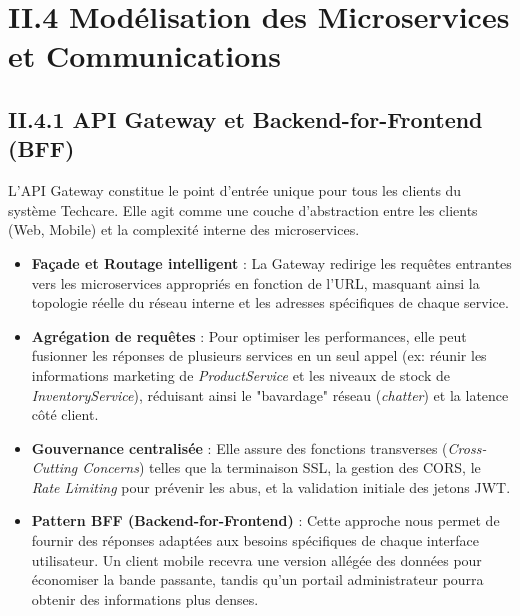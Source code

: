 \section{II.4 Modélisation des Microservices et Communications}
\label{sec:patterns}

\subsection{II.4.1 API Gateway et Backend-for-Frontend (BFF)}
L'API Gateway constitue le point d'entrée unique pour tous les clients du système Techcare. Elle agit comme une couche d'abstraction entre les clients (Web, Mobile) et la complexité interne des microservices.

\begin{itemize}
    \item \textbf{Façade et Routage intelligent} : La Gateway redirige les requêtes entrantes vers les microservices appropriés en fonction de l'URL, masquant ainsi la topologie réelle du réseau interne et les adresses spécifiques de chaque service.
    \item \textbf{Agrégation de requêtes} : Pour optimiser les performances, elle peut fusionner les réponses de plusieurs services en un seul appel (ex: réunir les informations marketing de \textit{ProductService} et les niveaux de stock de \textit{InventoryService}), réduisant ainsi le "bavardage" réseau (\textit{chatter}) et la latence côté client.
    \item \textbf{Gouvernance centralisée} : Elle assure des fonctions transverses (\textit{Cross-Cutting Concerns}) telles que la terminaison SSL, la gestion des CORS, le \textit{Rate Limiting} pour prévenir les abus, et la validation initiale des jetons JWT.
    \item \textbf{Pattern BFF (Backend-for-Frontend)} : Cette approche nous permet de fournir des réponses adaptées aux besoins spécifiques de chaque interface utilisateur. Un client mobile recevra une version allégée des données pour économiser la bande passante, tandis qu'un portail administrateur pourra obtenir des informations plus denses.
\end{itemize}


